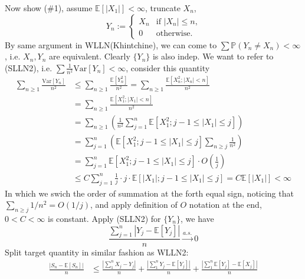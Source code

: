 \documentclass[a4paper,12pt,twoside]{book}
\begin{document}
\begin{itemize}
	Now show (\#1), assume $\mathbb{E}\left[|X_1|\right]<\infty$, truncate $X_n$,
	\begin{equation*}
		Y_n := \begin{cases}
		X_n &\text{if $|X_n|\leq n$,}\\
		0 &\text{otherwise.}
		\end{cases}
	\end{equation*}
	By same argument in WLLN(Khintchine), we can come to $\sum \mathbb{P}\left(Y_n\ne X_n\right)<\infty$, i.e. $X_n, Y_n$ are equivalent. Clearly $\{Y_n\}$ is also indep. \newline
	We want to refer to (SLLN2), i.e. $\sum\frac{1}{n^2}\mathrm{Var}\left[Y_n\right]<\infty$, consider this quantity
	\begin{equation}
		\begin{split}
			\sum_{n\geq 1} \frac{\mathrm{Var}\left[Y_n\right]}{n^2}&\leq \sum_{n\geq 1}\frac{\mathbb{E}\left[Y_n^2\right]}{n^2}=\sum_{n\geq 1}\frac{\mathbb{E}\left[X_n^2; |X_n|<n\right]}{n^2}\\
			&= \sum_{n\geq 1}\frac{\mathbb{E}\left[X_1^2; |X_1|<n\right]}{n^2}\\
			&= \sum_{n\geq 1}\left(\frac{1}{n^2}\sum_{j=1}^n\mathbb{E}\left[X_1^2; j-1\leq|X_1|\leq j\right]\right)\\
			&= \sum_{j=1}^n\left(\mathbb{E}\left[X_1^2; j-1\leq|X_1|\leq j\right]\sum_{n\geq j}\frac{1}{n^2}\right)\\
			&=\sum_{j=1}^n\mathbb{E}\left[X_1^2; j-1\leq|X_1|\leq j\right]\cdot O\left(\frac{1}{j}\right)\\
			&\leq C\sum_{j=1}^n\frac{1}{j}\cdot j \cdot \mathbb{E}\left[|X_1|; j-1\leq|X_1|\leq j\right]=C \mathbb{E}\left[|X_1|\right]<\infty
		\end{split}
	\end{equation}
	In which we swich the order of summation at the forth equal sign, noticing that $\sum_{n\geq j}1/n^2=O(1/j)$, and apply definition of $O$ notation at the end, $0<C<\infty$ is constant.\newline
	Apply (SLLN2) for $\{Y_n\}$, we have
	\begin{equation}
		\frac{\sum_{j=1}^n|Y_j- \mathbb{E}\left[Y_j\right]|}{n} \xrightarrow{a.s.} 0
	\end{equation}
	Split target quantity in similar fashion as WLLN2:
	\begin{equation}
		\begin{split}
			\frac{|S_n- \mathbb{E}\left[S_n\right]|}{n}
			&\leq\frac{|\sum_1^n X_j-Y_j|}{n}+\frac{|\sum_1^n Y_j- \mathbb{E}\left[Y_j\right]|}{n}+\frac{|\sum_1^n \mathbb{E}\left[Y_j\right]- \mathbb{E}\left[X_j\right]|}{n}\\

\end{split}
\end{equation}
\end{itemize}
\end{document}

